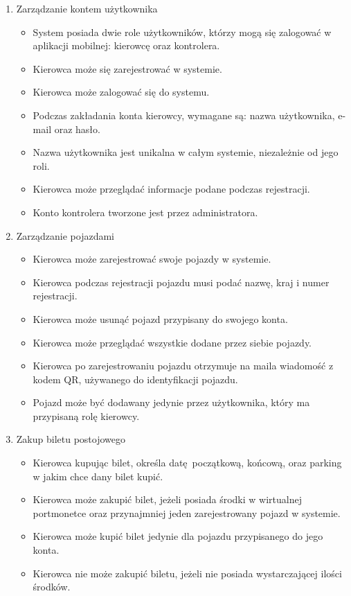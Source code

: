 \begin{enumerate}
	\item Zarządzanie kontem użytkownika
		\begin{itemize}
			\item System posiada dwie role użytkowników, którzy mogą się zalogować w aplikacji mobilnej: kierowcę oraz kontrolera.
			\item Kierowca może się zarejestrować w systemie.
			\item Kierowca może zalogować się do systemu.
			\item Podczas zakładania konta kierowcy, wymagane są: nazwa użytkownika, e-mail oraz hasło.
			\item Nazwa użytkownika jest unikalna w całym systemie, niezależnie od jego roli.
			\item Kierowca może przeglądać informacje podane podczas rejestracji.
			\item Konto kontrolera tworzone jest przez administratora.
		\end{itemize}
	\item Zarządzanie pojazdami
		\begin{itemize}
			\item Kierowca może zarejestrować swoje pojazdy w systemie.
			\item Kierowca podczas rejestracji pojazdu musi podać nazwę, kraj i numer rejestracji.
			\item Kierowca może usunąć pojazd przypisany do swojego konta.
			\item Kierowca może przeglądać wszystkie dodane przez siebie pojazdy.
			\item Kierowca po zarejestrowaniu pojazdu otrzymuje na maila wiadomość z kodem QR, używanego do identyfikacji pojazdu.
			\item Pojazd może być dodawany jedynie przez użytkownika, który ma przypisaną rolę kierowcy.
		\end{itemize}
	\item Zakup biletu postojowego
		\begin{itemize}
			\item Kierowca kupując bilet, określa datę początkową, końcową, oraz parking w jakim chce dany bilet kupić.
			\item Kierowca może zakupić bilet, jeżeli posiada środki w wirtualnej portmonetce oraz przynajmniej jeden zarejestrowany pojazd w systemie.
			\item Kierowca może kupić bilet jedynie dla pojazdu przypisanego do jego konta.
			\item Kierowca nie może zakupić biletu, jeżeli nie posiada wystarczającej ilości środków.

\end{itemize}
\end{enumerate}
